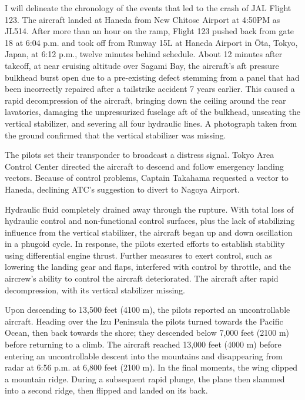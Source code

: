 \documentclass[a4paper,10pt]{article}
\begin{document}
I will delineate the chronology of the events that led to the crash of JAL Flight 123. The aircraft landed at Haneda from New Chitose Airport at 4:50PM as JL514. After more than an hour on the ramp, Flight 123 pushed back from gate 18 at 6:04 p.m. and took off from Runway 15L at Haneda Airport in Ōta, Tokyo, Japan, at 6:12 p.m., twelve minutes behind schedule. About 12 minutes after takeoff, at near cruising altitude over Sagami Bay, the aircraft's aft pressure bulkhead burst open due to a pre-existing defect stemming from a panel that had been incorrectly repaired after a tailstrike accident 7 years earlier. This caused a rapid decompression of the aircraft, bringing down the ceiling around the rear lavatories, damaging the unpressurized fuselage aft of the bulkhead, unseating the vertical stabilizer, and severing all four hydraulic lines. A photograph taken from the ground confirmed that the vertical stabilizer was missing.\par
The pilots set their transponder to broadcast a distress signal. Tokyo Area Control Center directed the aircraft to descend and follow emergency landing vectors. Because of control problems, Captain Takahama requested a vector to Haneda, declining ATC's suggestion to divert to Nagoya Airport.\par

Hydraulic fluid completely drained away through the rupture. With total loss of hydraulic control and non-functional control surfaces, plus the lack of stabilizing influence from the vertical stabilizer, the aircraft began up and down oscillation in a phugoid cycle. In response, the pilots exerted efforts to establish stability using differential engine thrust. Further measures to exert control, such as lowering the landing gear and flaps, interfered with control by throttle, and the aircrew's ability to control the aircraft deteriorated.
The aircraft after rapid decompression, with its vertical stabilizer missing.\par
Upon descending to 13,500 feet (4100 m), the pilots reported an uncontrollable aircraft. Heading over the Izu Peninsula the pilots turned towards the Pacific Ocean, then back towards the shore; they descended below 7,000 feet (2100 m) before returning to a climb. The aircraft reached 13,000 feet (4000 m) before entering an uncontrollable descent into the mountains and disappearing from radar at 6:56 p.m. at 6,800 feet (2100 m). In the final moments, the wing clipped a mountain ridge. During a subsequent rapid plunge, the plane then slammed into a second ridge, then flipped and landed on its back.\par
\end{document}
